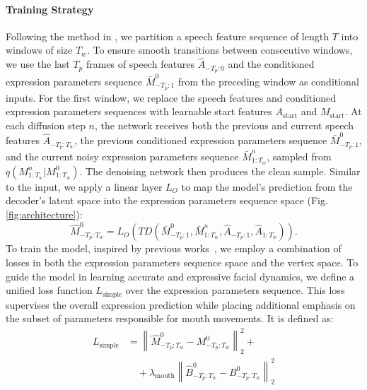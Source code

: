 \documentclass[a4paper, 10pt, conference]{ieeeconf}      %
\begin{document}
\paragraph{Training Strategy} 
Following the method in \cite{sun2023diffposetalk}, we partition a speech feature sequence of length \( T \) into windows of size \( T_w \). To ensure smooth transitions between consecutive windows, we use the last \( T_p \) frames of speech features \( \hat{A}_{-T_p:0} \) and the conditioned expression parameters sequence \( \bar{M}_{-T_p:1}^0 \) from the preceding window as conditional inputs. For the first window, we replace the speech features and conditioned expression parameters sequences with learnable start features \( A_{\text{start}} \) and \( M_{\text{start}} \). At each diffusion step \( n \), the network receives both the previous and current speech features \( \hat{A}_{-T_p:T_w} \), the previous conditioned expression parameters sequence \( \bar{M}_{-T_p:1}^0 \), and the current noisy expression parameters sequence \( \bar{M}_{1:T_w}^n \), sampled from \( q(M_{1:T_w}^n | M_{1:T_w}^0) \). The denoising network then produces the clean sample. Similar to the input, we apply a linear layer \( L_O \) to map the model's prediction from the decoder’s latent space into the expression parameters sequence space (Fig. \ref{fig:architecture}):
\begin{equation}
\hat{M}_{-T_p:T_w}^0 = L_O\left(TD(\bar{M}_{-T_p:1}^0, \bar{M}_{1:T_w}^n,  \hat{A}_{-T_p:1},  \hat{A}_{1:T_w})\right).
\end{equation}
\noindent
To train the model, inspired by previous works~\cite{sun2023diffposetalk, nocentini2024fixedtopologiesunregisteredtraining, Thambiraja_2023_ICCV_imitator, Fan_Lin_Saito_Wang_Komura_faceformer_2022, xing2023codetalker}, we employ a combination of losses in both the expression parameters sequence space and the vertex space. 
To guide the model in learning accurate and expressive facial dynamics, we define a unified loss function \( L_{\text{simple}} \) over the expression parameters sequence. This loss supervises the overall expression prediction while placing additional emphasis on the subset of parameters responsible for mouth movements. It is defined as:
\begin{equation}
\begin{split}
L_{\text{simple}} &= \left\| \hat{M}_{-T_p:T_w}^0 - M_{-T_p:T_w}^0 \right\|_2^2 + \\
&\quad + \lambda_{\text{mouth}} \left\| \hat{B}_{-T_p:T_w}^0 - B_{-T_p:T_w}^0 \right\|_2^2
\end{split}
\end{equation}
\end{document}
